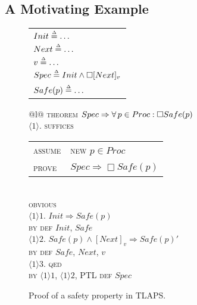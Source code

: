 \documentclass[a4paper,fleqn,envcountsame,orivec]{llncs}
\newcommand{\implies}{\Rightarrow}
\newcommand{\kw}[1]{\textsc{#1}}  %
\newcommand{\ps}[2]{\ensuremath{\langle #1 \rangle #2}}
\begin{document}
\subsection{A Motivating Example} \label{sec:motivating}

\begin{figure}[bp]
  \begin{minipage}[t]{.4\linewidth}
    \begin{tabular}[t]{@{}l@{}}
      $Init \mathrel{\stackrel{\scriptscriptstyle\Delta}{=}} \ldots$\\
      $Next \mathrel{\stackrel{\scriptscriptstyle\Delta}{=}} \ldots$\\
      $v \mathrel{\stackrel{\scriptscriptstyle\Delta}{=}} \ldots$\\
      $Spec \mathrel{\stackrel{\scriptscriptstyle\Delta}{=}} Init \land \square[Next]_v$\\[.5ex]
      $Safe(p) \mathrel{\stackrel{\scriptscriptstyle\Delta}{=}} \ldots$
    \end{tabular}
  \end{minipage}
  \quad
  \begin{minipage}[t]{.55\linewidth}
    \begin{tabular}[t]{@{}l@{}}
      \kw{theorem} $Spec \implies \A p \in Proc : \Box Safe(p)$\\
      \ps{1}{.} \kw{suffices}
                  \begin{tabular}[t]{ll}
                    \kw{assume} & \kw{new} $p \in Proc$\\
                    \kw{prove}  & $Spec \implies \Box Safe(p)$
                  \end{tabular}\\[-.4em]
      \quad\kw{obvious}\\
      \ps{1}{1.} $Init \implies Safe(p)$\\
      \quad\kw{by} \kw{def} $Init$, $Safe$\\
      \ps{1}{2.}
         $Safe(p) \land [Next]_v \implies Safe(p)'$\\
      \quad\kw{by} \kw{def}
        $Safe$, $Next$, $v$\\
      \ps{1}{3.} \kw{qed}\\
      \quad\kw{by} \ps{1}{1}, \ps{1}{2},
      PTL \kw{def} $Spec$
    \end{tabular}
  \end{minipage}
  \caption{Proof of a safety property in TLAPS.}
  \label{fig:safety-example}
\end{figure}
\end{document}

